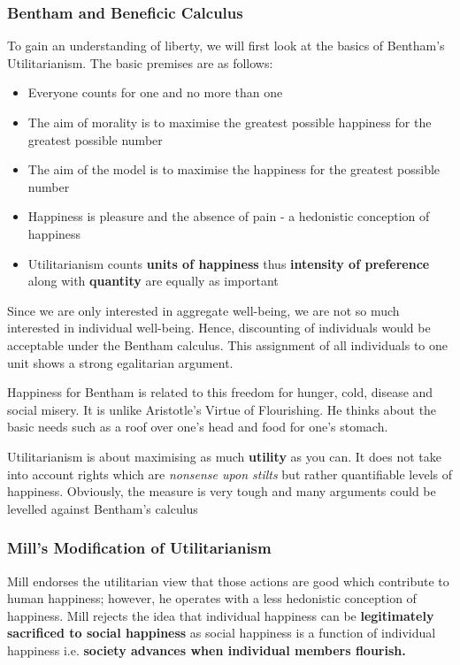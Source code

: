 \documentclass[12pt, letterpaper]{article}
\begin{document}
\subsubsection{Bentham and Beneficic Calculus}
To gain an understanding of liberty, we will first look at the basics of Bentham's Utilitarianism. The basic premises are as follows:
\begin{itemize}
	\item Everyone counts for one and no more than one
	\item The aim of morality is to maximise the greatest possible happiness for the greatest possible number
	\item The aim of the model is to maximise the happiness for the greatest possible number
	\item Happiness is pleasure and the absence of pain - a hedonistic conception of happiness
	\item Utilitarianism counts \textbf{units of happiness} thus \textbf{intensity of preference} along with \textbf{quantity} are equally as important
\end{itemize}
Since we are only interested in aggregate well-being, we are not so much interested in individual well-being. Hence, discounting of individuals would be acceptable under the Bentham calculus. This assignment of all individuals to one unit shows a strong egalitarian argument.

Happiness for Bentham is related to this freedom for hunger, cold, disease and social misery. It is unlike Aristotle's Virtue of Flourishing. He thinks about the basic needs such as a roof over one's head and food for one's stomach.

Utilitarianism is about maximising as much \textbf{utility} as you can. It does not take into account rights which are \textit{nonsense upon stilts} but rather quantifiable levels of happiness. Obviously, the measure is very tough and many arguments could be levelled against Bentham's calculus

\subsubsection{Mill's Modification of Utilitarianism}
Mill endorses the utilitarian view that those actions are good which contribute to human happiness; however, he operates with a less hedonistic conception of happiness. Mill rejects the idea that individual happiness can be \textbf{legitimately sacrificed to social happiness} as social happiness is a function of individual happiness i.e. \textbf{society advances when individual members flourish.}
\end{document}
